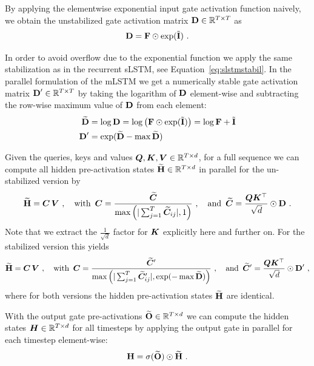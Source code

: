 \documentclass[dvipsnames]{article}
\begin{document}
\begin{appendix}
By applying the elementwise exponential input gate activation function naively, we obtain the unstabilized gate activation matrix $\bm{\mathrm{D}} \in \mathbb{R}^{T \times T}$ as
\begin{equation}
    \bm{\mathrm{D}} = \bm{\mathrm{F}} \odot \exp(\tilde{\bm{\mathrm{I}}}) \ .
\end{equation}

In order to avoid overflow due to the exponential function we apply the same stabilization as in the recurrent sLSTM, see Equation~\ref{eq:slstmstabil}.
In the parallel formulation of the mLSTM we get a numerically stable gate activation matrix $\bm{\mathrm{D}}' \in \mathbb{R}^{T \times T}$
by taking the logarithm of $\bm{\mathrm{D}}$ element-wise and subtracting the row-wise maximum value of $\bm{\mathrm{D}}$ from each element:
\begin{align}
    \widetilde{\bm{\mathrm{D}}} & = \log \bm{\mathrm{D}} = \log \left(\bm{\mathrm{F}} \odot \exp(\tilde{\bm{\mathrm{I}}})\right) = \log \bm{\mathrm{F}} + \tilde{\bm{\mathrm{I}}} \\
    \bm{\mathrm{D}}'            & = \exp(\widetilde{\bm{\mathrm{D}}} - \max \widetilde{\bm{\mathrm{D}}})
\end{align}

Given the queries, keys and values $\bm{Q}, \bm{K}, \bm{V} \in \mathbb{R}^{T \times d}$, for a full sequence we can compute all hidden pre-activation states $\widetilde{\bm{\mathrm{H}}} \in \mathbb{R}^{T \times d}$
in parallel for the un-stabilized version by
\begin{equation}
    \widetilde{\bm{\mathrm{H}}} = \bm{C} \, \bm{V} \ , \quad \text{with} \, \, \, \bm{C} = \frac{\widetilde{\bm{C}}}{\max \left( | \sum_{j=1}^{T} \widetilde{\bm{C}}_{ij}|, 1\right)} \ , \quad 
    \text{and} \, \, \, \widetilde{\bm{C}} = \frac{\bm{Q} \bm{K}^\top }{\sqrt{d}} \odot \bm{\mathrm{D}} \ .
\end{equation}
Note that we extract the $\frac{1}{\sqrt{d}}$ factor for $\bm{K}$ explicitly here and further on. For the stabilized version this yields
\begin{equation}
    \widetilde{\bm{\mathrm{H}}} = \bm{C} \, \bm{V} \ , \quad \text{with} \, \, \, \bm{C} = \frac{\widetilde{\bm{C}}'}{\max \left( | \sum_{j=1}^{T} \widetilde{\bm{C}}'_{ij}|, \exp(-\max \widetilde{\bm{\mathrm{D}}})\right)} \ , \quad 
    \text{and} \, \, \, \widetilde{\bm{C}}' = \frac{\bm{Q} \bm{K}^\top}{\sqrt{d}} \odot \bm{\mathrm{D}}' \ , 
\end{equation}
where for both versions the hidden pre-activation states $\widetilde{\bm{\mathrm{H}}}$ are identical.

With the output gate pre-activations $\widetilde{\bm{\mathrm{O}}} \in \mathbb{R}^{T \times d}$ we can compute the hidden states $\bm{H} \in \mathbb{R}^{T \times d}$ for all timesteps 
by applying the output gate in parallel for each timestep element-wise:
\begin{equation}
    \bm{\mathrm{H}} = \sigma(\widetilde{\bm{\mathrm{O}}}) \odot \widetilde{\bm{\mathrm{H}}} \ .
\end{equation}


\end{appendix}
\end{document}
